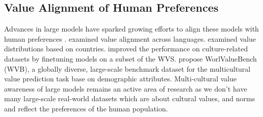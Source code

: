
\subsection{Value Alignment of Human Preferences}
Advances in large models have sparked
growing efforts to align these models with human preferences \citep{ganguli2023capacity,scherrer2024evaluating}. \citet{arora-etal-2023-probing} examined value alignment across languages. \citet{durmus2023towards} examined value distributions based on countries. \citet{li2024culture} improved the performance on culture-related datasets by finetuning models on a subset of the WVS.
\citet{zhao2024worldvaluesbench} propose WorlValueBench
(WVB), a globally diverse, large-scale benchmark
dataset for the multicultural value prediction
task base on demographic attributes. Multi-cultural value awareness of large models remains an active area of research as we don't have many large-scale real-world datasets which are about cultural values, and norms and reflect the preferences of the human population.

